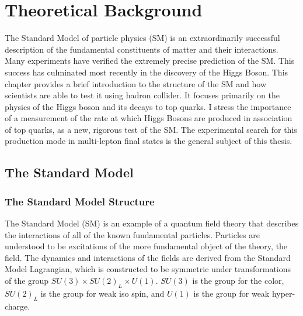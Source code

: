 \chapter[Theoretical Background][Theoretical Background]{Theoretical Background}

The Standard Model of particle physics (SM) is an extraordinarily successful
description of the fundamental constituents of matter and their interactions.
Many experiments have verified the extremely precise
prediction of the SM. This success has culminated most recently in the
discovery of the Higgs Boson.  This chapter provides a brief introduction to
the structure of the SM and how scientists are able to test it using hadron
collider. It focuses primarily on the physics of the Higgs boson and its decays
to top quarks.  I stress the importance of a
measurement of the rate at which Higgs Bosons are produced in association of
top quarks, as a new, rigorous test of the SM. The experimental search
for this production mode in multi-lepton final states is the 
general subject of this thesis.


\section{The Standard Model}
\subsection{The Standard Model Structure}

The Standard Model (SM) \cite{np_22_579, prl_19_1264, 1964.Salam-Ward.gauge-theory,1973.Weinberg.SM-with-QCD} is an example of a quantum field theory that describes
the interactions of all of the known fundamental particles. Particles are understood to be excitations of the more fundamental
object of the theory, the field. The dynamics and interactions of the fields are
derived from the Standard Model Lagrangian, which is constructed to be
symmetric under transformations of the group $SU(3) \times SU(2)_L
  \times U(1)$. $SU(3)$ is the group for the color, $SU(2)_L$ is the group 
for weak iso spin, and $U(1)$ is the group for weak hyper-charge.

